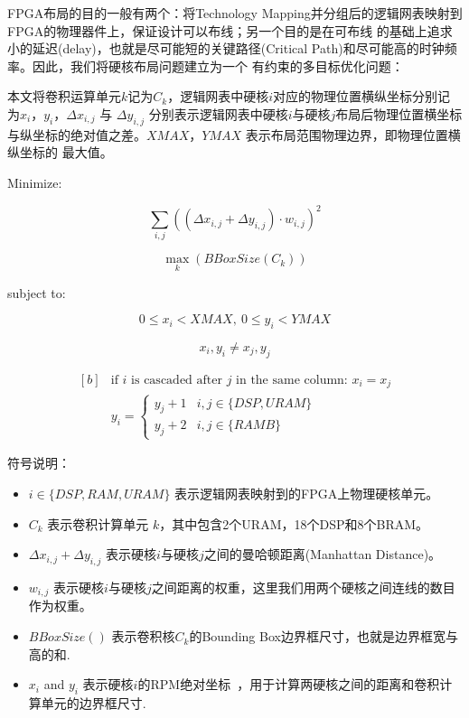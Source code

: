FPGA布局的目的一般有两个：将Technology Mapping并分组后的逻辑网表映射到FPGA的物理器件上，保证设计可以布线；另一个目的是在可布线
的基础上追求小的延迟(delay)，也就是尽可能短的关键路径(Critical Path)和尽可能高的时钟频率。因此，我们将硬核布局问题建立为一个
有约束的多目标优化问题：

本文将卷积运算单元$k$记为$C_k$，逻辑网表中硬核$i$对应的物理位置横纵坐标分别记为$x_i$，$y_i$，$\Delta{x_{i,j}}$ 与 $\Delta{y_{i,j}}$
分别表示逻辑网表中硬核$i$与硬核$j$布局后物理位置横坐标与纵坐标的绝对值之差。$XMAX$，$YMAX$ 表示布局范围物理边界，即物理位置横纵坐标的
最大值。

Minimize: 

\begin{equation} \label{eq:obj1}
	\sum_{i,j} ((\Delta{x_{i,j}} + \Delta{y_{i,j}}) \cdot w_{i,j})^2 
\end{equation}

\begin{equation} \label{eq:obj2}
	 \max_{k} (BBoxSize(C_k))
\end{equation}

subject to:

\begin{equation} \label{eq:region}
  0 \leq x_i < XMAX ,\ 
  0 \leq y_i < YMAX
\end{equation}


\begin{equation} \label{eq:overlap}
    {x_i,y_i} \neq {x_j,y_j}
\end{equation}

\begin{equation} \label{eq:cascade}
  \begin{aligned}[b]
	& \textrm{if } i \textrm{ is cascaded after } j \textrm{ in the same column: }
  x_i = x_j \\
	& y_i =
	\begin{cases}
		 y_j + 1  & i, j \in \{  DSP, URAM  \} \\
		 y_j + 2  & i, j \in \{  RAMB \}
	\end{cases}
\end{aligned}
\end{equation}

符号说明：
\begin{itemize}
	\item $i \in \{ DSP, RAM, URAM \} $ 表示逻辑网表映射到的FPGA上物理硬核单元。
	\item $C_k$ 表示卷积计算单元 $k$，其中包含2个URAM，18个DSP和8个BRAM。 
	\item $\Delta{x_{i,j}} + \Delta{y_{i,j}}$ 表示硬核$i$与硬核$j$之间的曼哈顿距离(Manhattan Distance)。
	\item $w_{i,j}$ 表示硬核$i$与硬核$j$之间距离的权重，这里我们用两个硬核之间连线的数目作为权重。
	\item $BBoxSize()$ 表示卷积核$C_k$的Bounding Box边界框尺寸，也就是边界框宽与高的和. 
	\item $x_i$ and $y_i$ 表示硬核$i$的RPM绝对坐标~\cite{ug903}，用于计算两硬核之间的距离和卷积计算单元的边界框尺寸.
\end{itemize}

